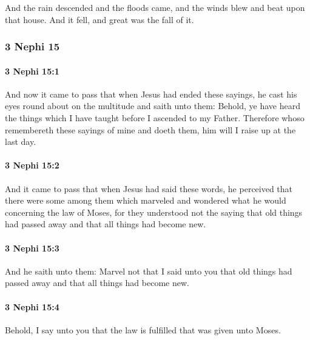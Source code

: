 			And the rain descended and the floods came,
			and the winds blew and beat upon that house.
			And it fell, and great was the fall of it.

	\subsubsection{3 Nephi 15} %
		\label{3NEPHI-15}
		
		\paragraph{3 Nephi 15:1} %
			\label{3NEPHI-15-1}

			And now it came to pass that when Jesus had ended these sayings,
			he cast his eyes round about on the multitude and saith unto them:
			Behold, ye have heard the things
			which I have taught before I ascended to my Father.
			Therefore whoso remembereth these sayings of mine and doeth them,
			him will I raise up at the last day.

		\paragraph{3 Nephi 15:2} %
			\label{3NEPHI-15-2}

			And it came to pass that when Jesus had said these words,
			he perceived that there were some among them
			which marveled and wondered what he would concerning the law of Moses,
			for they understood not the saying
			that old things had passed away
			and that all things had become new.

		\paragraph{3 Nephi 15:3} %
			\label{3NEPHI-15-3}

			And he saith unto them:
			Marvel not that I said unto you that old things had passed away
			and that all things had become new.

		\paragraph{3 Nephi 15:4} %
			\label{3NEPHI-15-4}

			Behold, I say unto you that the law is fulfilled that was given unto Moses.

